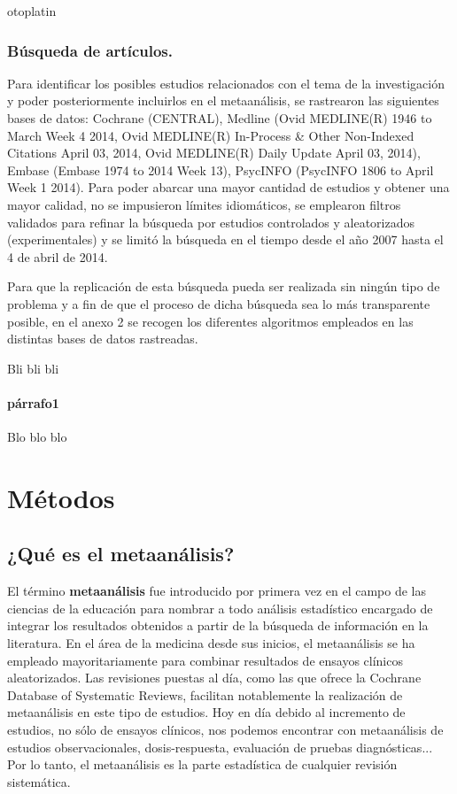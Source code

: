 otoplatin\documentclass[a4paper,openright,12pt]{report}
\begin{document}
\subsubsection{Búsqueda de artículos.}

Para identificar los posibles estudios relacionados con el tema de la investigación y poder posteriormente incluirlos en el metaanálisis, se rastrearon las siguientes bases de datos: Cochrane (CENTRAL), Medline (Ovid MEDLINE(R) 1946 to March Week 4 2014, Ovid MEDLINE(R) In-Process & Other Non-Indexed Citations April 03, 2014,  Ovid MEDLINE(R) Daily Update April 03, 2014), Embase (Embase 1974 to 2014 Week 13), PsycINFO (PsycINFO 1806 to April Week 1 2014). Para poder abarcar una mayor cantidad de estudios y obtener una mayor calidad, no se impusieron límites idiomáticos, se emplearon filtros validados para refinar la búsqueda por estudios controlados y aleatorizados (experimentales) y se limitó la búsqueda en el tiempo desde el año 2007 hasta el 4 de abril de 2014.

Para que la replicación de esta búsqueda pueda ser realizada sin ningún tipo de problema y a fin de que el proceso de dicha búsqueda sea lo más transparente posible, en el anexo 2 se recogen los diferentes algoritmos empleados en las distintas bases de datos rastreadas.

Bli bli bli
\paragraph{párrafo1}
Blo blo blo
\newpage
\section{Métodos}
\subsection{¿Qué es el metaanálisis?}

El término \textbf{metaanálisis} fue introducido por primera vez en el campo de las ciencias de la educación \cite{Glass1976} para nombrar a todo análisis estadístico encargado de integrar los resultados obtenidos a partir de la búsqueda de información en la literatura. En el área de la medicina desde sus inicios, el metaanálisis se ha empleado mayoritariamente para combinar resultados de ensayos clínicos aleatorizados. Las revisiones puestas al día, como las que ofrece la Cochrane Database of Systematic Reviews, facilitan notablemente la realización de metaanálisis en este tipo de estudios. Hoy en día debido al incremento de estudios, no sólo de ensayos clínicos, nos podemos encontrar con metaanálisis de estudios observacionales, dosis-respuesta, evaluación de pruebas diagnósticas...  Por lo tanto, el metaanálisis es la parte estadística de cualquier revisión sistemática.
\end{document}
